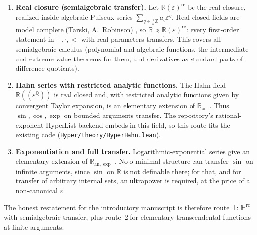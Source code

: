 \documentclass[11pt]{article}
\theoremstyle{definition}
\theoremstyle{remark}
\newcommand{\R}{\mathbb R}
\newcommand{\Q}{\mathbb Q}
\newcommand{\Z}{\mathbb Z}
\newcommand{\eps}{\varepsilon}
\newcommand{\HH}{\mathbb H}
\begin{document}
\begin{enumerate}
\item \textbf{Real closure (semialgebraic transfer).} Let
$\R(\eps)^{\mathrm{rc}}$ be the real closure, realized inside algebraic
Puiseux series $\sum_{q\in\frac1n\Z}a_q\eps^q$. Real closed fields are
model complete (Tarski, A.~Robinson) \cite{marker}, so
$\R\preccurlyeq\R(\eps)^{\mathrm{rc}}$: every first-order statement in
$+,\cdot,<$ with real parameters transfers. This covers all
semialgebraic calculus (polynomial and algebraic functions, the
intermediate and extreme value theorems for them, and derivatives as
standard parts of difference quotients).
\item \textbf{Hahn series with restricted analytic functions.} The
Hahn field $\R((\eps^{\Q}))$ is real closed and, with restricted
analytic functions given by convergent Taylor expansion, is an
elementary extension of $\R_{\mathrm{an}}$ \cite{dmm94}. Thus
$\sin,\cos,\exp$ on bounded arguments transfer. The repository's
rational-exponent HyperList backend embeds in this field, so this route
fits the existing code (\texttt{Hyper/theory/HyperHahn.lean}).
\item \textbf{Exponentiation and full transfer.} Logarithmic-exponential
series give an elementary extension of $\R_{\mathrm{an},\exp}$
\cite{dmm97}. No o-minimal structure can transfer $\sin$ on infinite
arguments, since $\sin$ on $\R$ is not definable there; for that, and
for transfer of arbitrary internal sets, an ultrapower is required, at
the price of a non-canonical $\eps$.
\end{enumerate}
The honest restatement for the introductory manuscript is therefore
route~1: $\HH^{\mathrm{rc}}$ with semialgebraic transfer, plus route~2
for elementary transcendental functions at finite arguments.
\end{document}
